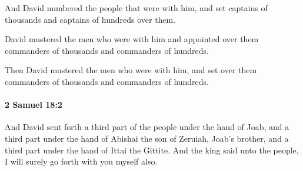 			\begin{versebox}
					\item[BHS] 
					\item[ASV] And David numbered the people that were with him, and set captains of thousands and captains of hundreds over them.
					\item[NIV] David mustered the men who were with him and appointed over them commanders of thousands and commanders of hundreds.
					\item[NRSV] Then David mustered the men who were with him, and set over them commanders of thousands and commanders of hundreds.
			\end{versebox}

		\paragraph{2 Samuel 18:2} %
			\label{2SAMUEL-18-2}

			And David sent forth a third part of the people under the hand of Joab, and a third part under the hand of Abishai the son of Zeruiah, Joab’s brother, and a third part under the hand of Ittai the Gittite. And the king said unto the people, I will surely go forth with you myself also.

